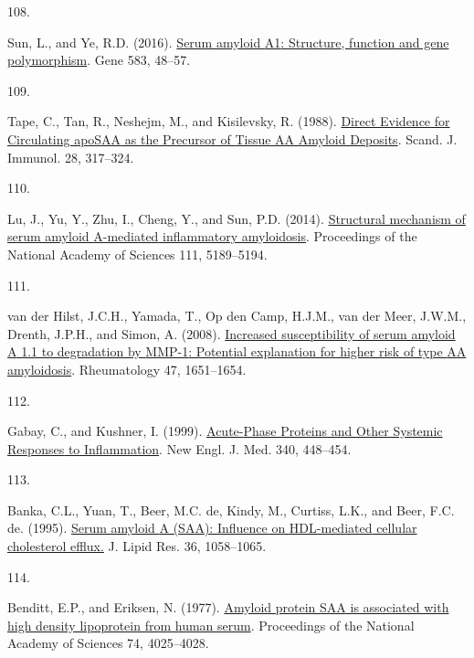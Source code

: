 \documentclass[
]{article}
\newlength{\cslhangindent}
\newlength{\csllabelwidth}
\newlength{\cslentryspacingunit} %
\newenvironment{CSLReferences}[2] %
 {%
  \setlength{\parindent}{0pt}
  \ifodd #1
  \let\oldpar\par
  \def\par{\hangindent=\cslhangindent\oldpar}
  \fi
  \setlength{\parskip}{#2\cslentryspacingunit}
 }%
 {}
\newcommand{\CSLLeftMargin}[1]{\parbox[t]{\csllabelwidth}{#1}}
\newcommand{\CSLRightInline}[1]{\parbox[t]{\linewidth - \csllabelwidth}{#1}\break}
\begin{document}
\begin{CSLReferences}{0}{0}
\leavevmode{}%
\CSLLeftMargin{108. }
\CSLRightInline{Sun, L., and Ye, R.D. (2016). \href{https://doi.org/10.1016/j.gene.2016.02.044}{Serum amyloid {A1}: {Structure}, function and gene polymorphism}. Gene 583, 48--57.}

\leavevmode{}%
\CSLLeftMargin{109. }
\CSLRightInline{Tape, C., Tan, R., Neshejm, M., and Kisilevsky, R. (1988). \href{https://doi.org/10.1111/j.1365-3083.1988.tb01455.x}{Direct {Evidence} for {Circulating apoSAA} as the {Precursor} of {Tissue AA Amyloid Deposits}}. Scand. J. Immunol. 28, 317--324.}

\leavevmode{}%
\CSLLeftMargin{110. }
\CSLRightInline{Lu, J., Yu, Y., Zhu, I., Cheng, Y., and Sun, P.D. (2014). \href{https://doi.org/10.1073/pnas.1322357111}{Structural mechanism of serum amyloid {A-mediated} inflammatory amyloidosis}. Proceedings of the National Academy of Sciences 111, 5189--5194.}

\leavevmode{}%
\CSLLeftMargin{111. }
\CSLRightInline{van der Hilst, J.C.H., Yamada, T., Op den Camp, H.J.M., van der Meer, J.W.M., Drenth, J.P.H., and Simon, A. (2008). \href{https://doi.org/10.1093/rheumatology/ken371}{Increased susceptibility of serum amyloid {A} 1.1 to degradation by {MMP-1}: Potential explanation for higher risk of type {AA} amyloidosis}. Rheumatology 47, 1651--1654.}

\leavevmode{}%
\CSLLeftMargin{112. }
\CSLRightInline{Gabay, C., and Kushner, I. (1999). \href{https://doi.org/10.1056/NEJM199902113400607}{Acute-{Phase Proteins} and {Other Systemic Responses} to {Inflammation}}. New Engl. J. Med. 340, 448--454.}

\leavevmode{}%
\CSLLeftMargin{113. }
\CSLRightInline{Banka, C.L., Yuan, T., Beer, M.C. de, Kindy, M., Curtiss, L.K., and Beer, F.C. de. (1995). \href{https://www.ncbi.nlm.nih.gov/pubmed/7658153}{Serum amyloid {A} ({SAA}): Influence on {HDL-mediated} cellular cholesterol efflux.} J. Lipid Res. 36, 1058--1065.}

\leavevmode{}%
\CSLLeftMargin{114. }
\CSLRightInline{Benditt, E.P., and Eriksen, N. (1977). \href{https://doi.org/10.1073/pnas.74.9.4025}{Amyloid protein {SAA} is associated with high density lipoprotein from human serum}. Proceedings of the National Academy of Sciences 74, 4025--4028.}


\end{CSLReferences}
\end{document}
